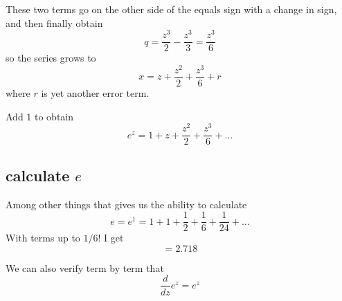 \documentclass[11pt, oneside]{article}
\begin{document}
These two terms go on the other side of the equals sign with a change in sign, and then finally obtain
\[ q = \frac{z^3}{2} - \frac{z^3}{3} = \frac{z^3}{6} \]
so the series grows to
\[ x = z +  \frac{z^2}{2} + \frac{z^3}{6} + r \]
where $r$ is yet another error term.

Add $1$ to obtain
\[ e^z = 1 + z +  \frac{z^2}{2} + \frac{z^3}{6} + \dots \]

\subsection*{calculate $e$}

Among other things that gives us the ability to calculate 
\[ e = e^1 = 1 + 1 + \frac{1}{2} + \frac{1}{6} + \frac{1}{24} + \dots \]
With terms up to $1/6!$ I get
\[ = 2.718 \]

We can also verify term by term that
\[ \frac{d}{dz} e^z = e^z \]
\end{document}
